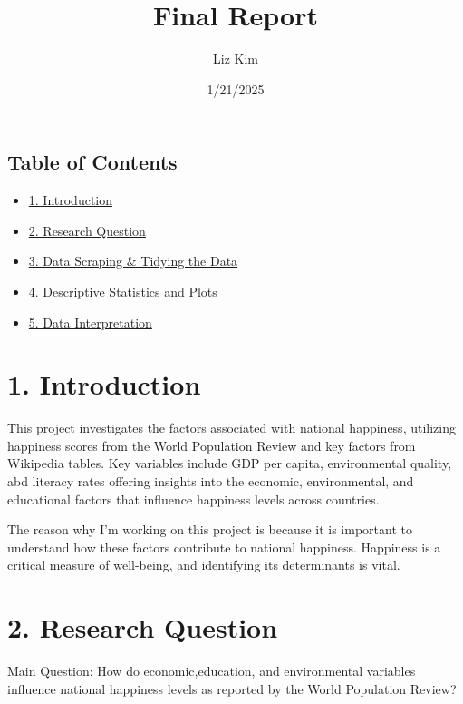 \documentclass[
]{article}
\title{Final Report}
\author{Liz Kim}
\date{1/21/2025}
\providecommand{\tightlist}{%
  \setlength{\itemsep}{0pt}\setlength{\parskip}{0pt}}
\begin{document}
\maketitle

\hypertarget{table-of-contents}{%
\subsection{Table of Contents}\label{table-of-contents}}

\begin{itemize}
\tightlist
\item
  \protect\hyperlink{introduction}{1. Introduction}
\item
  \protect\hyperlink{research-question}{2. Research Question}
\item
  \protect\hyperlink{Data-Scaping-and-Tidying-the-Data}{3. Data Scraping
  \& Tidying the Data}
\item
  \protect\hyperlink{descriptive-statistics-and-plots}{4. Descriptive
  Statistics and Plots}
\item
  \protect\hyperlink{data-interpretation}{5. Data Interpretation}
\end{itemize}

\hypertarget{introduction}{%
\section{1. Introduction}\label{introduction}}

This project investigates the factors associated with national
happiness, utilizing happiness scores from the World Population Review
and key factors from Wikipedia tables. Key variables include GDP per
capita, environmental quality, abd literacy rates offering insights into
the economic, environmental, and educational factors that influence
happiness levels across countries.

The reason why I'm working on this project is because it is important to
understand how these factors contribute to national happiness. Happiness
is a critical measure of well-being, and identifying its determinants is
vital.

\hypertarget{research-question}{%
\section{2. Research Question}\label{research-question}}

Main Question: How do economic,education, and environmental variables
influence national happiness levels as reported by the World Population
Review?
\end{document}
